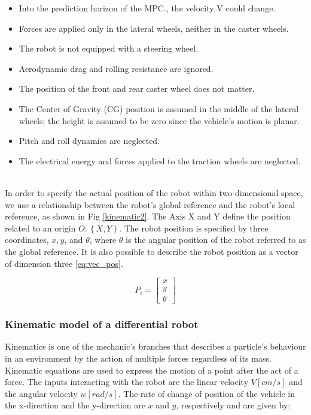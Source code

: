 \begin{itemize}
    \item Into the prediction horizon of the MPC., the velocity V could change.
    \item Forces are applied only in the lateral wheels, neither in the caster wheels.
    \item The robot is not equipped with a steering wheel.
    \item Aerodynamic drag and rolling resistance are ignored.
    \item The position of the front and rear caster wheel does not matter.
    \item The Center of Gravity (CG) position is assumed in the middle of the lateral wheels; the height is assumed to be zero since the vehicle's motion is planar.
    \item Pitch and roll dynamics are neglected. 
    \item The electrical energy and forces applied to the traction wheels are neglected.
\end{itemize}
\\

In order to specify the actual position of the robot within two-dimensional space, we use a relationship between the robot's global reference and the robot's local reference, as shown in Fig \ref{kinematic2}. The Axis X and Y define the position related to an origin $O: \left\{ X, Y \right\}$. The robot position is specified by three coordinates, $x, y$, and $\theta$, where $\theta$ is the angular position of the robot referred to as the global reference. It is also possible to describe the robot position as a vector of dimension three \ref{eq:vec_pos}.


\begin{equation}
\label{eq:vec_pos}
P_i= \begin{bmatrix}
x \\ 
y \\ 
\theta
\end{bmatrix}
\end{equation}

\subsubsection{Kinematic model of a differential robot}
Kinematics is one of the mechanic's branches that describes a particle's behaviour in an environment by the action of multiple forces regardless of its mass. Kinematic equations are used to express the motion of a point after the act of a force. The inputs interacting with the robot are the linear velocity $V [cm/s]$ and the angular velocity $w [rad/s]$. The rate of change of position of the vehicle in the x-direction and the y-direction are $x$ and $y$, respectively and are given by:


